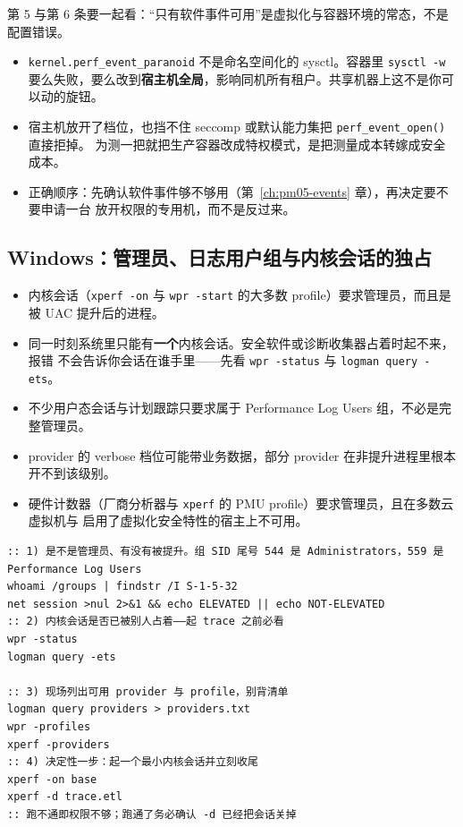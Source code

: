 \documentclass[12pt,a4paper,fontset=fandol]{ctexbook}
\newcommand{\Fn}[1]{\texttt{#1()}}
\newcommand{\Tp}[1]{\texttt{#1}}
\newcommand{\Bk}{\discretionary{}{}{}}
\begin{document}
第 5 与第 6 条要一起看：``只有软件事件可用''是虚拟化与容器环境的常态，不是配置错误。

\begin{warning}[title={改全局档位不是解决办法，而且常常改不动}]
\begin{itemize}
  \item \Tp{kernel.perf\_event{\Bk}\_paranoid} 不是命名空间化的 sysctl。容器里 \Tp{sysctl -w}
        要么失败，要么改到\textbf{宿主机全局}，影响同机所有租户。共享机器上这不是你可以动的旋钮。
  \item 宿主机放开了档位，也挡不住 seccomp 或默认能力集把 \Fn{perf\_event{\Bk}\_open} 直接拒掉。
        为测一把就把生产容器改成特权模式，是把测量成本转嫁成安全成本。
  \item 正确顺序：先确认软件事件够不够用（第~\ref{ch:pm05-events} 章），再决定要不要申请一台
        放开权限的专用机，而不是反过来。
\end{itemize}
\end{warning}

\subsection{Windows：管理员、日志用户组与内核会话的独占}

\begin{itemize}
  \item 内核会话（\Tp{xperf -on} 与 \Tp{wpr -start} 的大多数 profile）要求管理员，而且是
        被 UAC 提升后的进程。
  \item 同一时刻系统里只能有\textbf{一个}内核会话。安全软件或诊断收集器占着时起不来，报错
        不会告诉你会话在谁手里——先看 \Tp{wpr -status} 与 \Tp{logman query -ets}。
  \item 不少用户态会话与计划跟踪只要求属于 Performance Log Users 组，不必是完整管理员。
  \item provider 的 verbose 档位可能带业务数据，部分 provider 在非提升进程里根本开不到该级别。
  \item 硬件计数器（厂商分析器与 \Tp{xperf} 的 PMU profile）要求管理员，且在多数云虚拟机与
        启用了虚拟化安全特性的宿主上不可用。
\end{itemize}

\begin{lstlisting}[style=shellstyle, caption={Windows 权限与可用性自查（工具本身要先装，可用性随 SDK 组件变）}, label={lst:pmapA-win-perm}]
:: 1) 是不是管理员、有没有被提升。组 SID 尾号 544 是 Administrators，559 是 Performance Log Users
whoami /groups | findstr /I S-1-5-32
net session >nul 2>&1 && echo ELEVATED || echo NOT-ELEVATED
:: 2) 内核会话是否已被别人占着——起 trace 之前必看
wpr -status
logman query -ets

:: 3) 现场列出可用 provider 与 profile，别背清单
logman query providers > providers.txt
wpr -profiles
xperf -providers
:: 4) 决定性一步：起一个最小内核会话并立刻收尾
xperf -on base
xperf -d trace.etl
:: 跑不通即权限不够；跑通了务必确认 -d 已经把会话关掉
\end{lstlisting}
\end{document}
